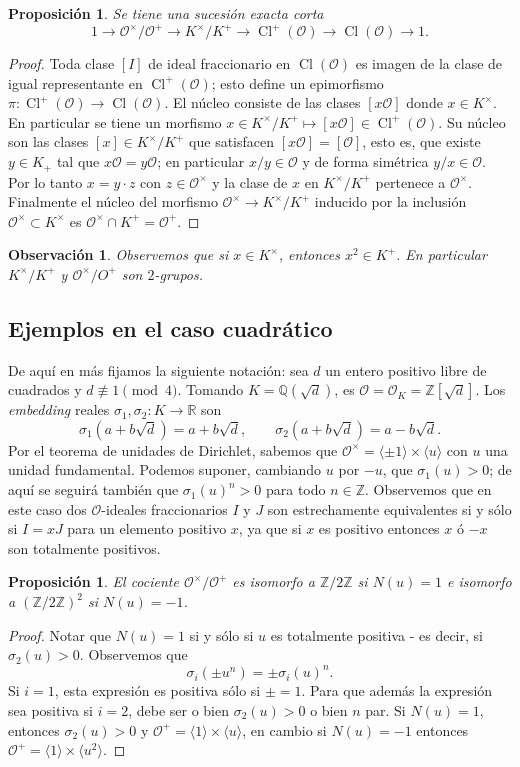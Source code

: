 \documentclass[11pt,a4paper]{amsart}
\newcommand{\R}{\mathbb{R}}
\newcommand{\Q}{\mathbb{Q}}
\newcommand{\Z}{\mathbb{Z}}
\DeclareMathOperator{\CL}{Cl}
\numberwithin{equation}{section}
\theoremstyle{plain}
\newtheorem{prop}[equation]{Proposición}
\newtheorem{obs}[equation]{Observación}
\renewcommand{\O}{\mathcal{O}}
\begin{document}
\begin{prop} Se tiene una sucesión exacta corta
\[
1 \to \O^\times/\O^+ \to K^\times/K^+ \to
\CL^+(\O) \to \CL(\O) \to 1.
\]
\end{prop}
\begin{proof} Toda clase $[I]$ de ideal fraccionario
en $\CL(\O)$ es imagen de la clase de igual representante en $\CL^+(\O)$;
esto define un epimorfismo $\pi \colon \CL^+(\O)\to\CL(\O)$. El núcleo consiste
de las clases $[x \O]$ donde $x \in K^\times$. En particular se tiene
un morfismo $x\in K^\times/K^+ \mapsto [x \O] \in \CL^+(\O)$.
Su núcleo son las clases $[x] \in K^\times/K^+$ que satisfacen
$[x\O] = [\O]$, esto es, que existe $y \in K_+$ tal que $x \O = y \O$;
en particular $x/y \in \O$ y de forma simétrica $y/x \in \O$.
Por lo tanto $x = y \cdot z$ con $z \in \O^\times$
y la clase de $x$ en $K^\times/K^+$ pertenece a $\O^\times$. Finalmente
el núcleo del morfismo $\O^\times \to K^\times/K^+$ inducido por la inclusión
$\O^\times \subset K^\times$ es $\O^\times \cap K^+ = \O^+$.
\end{proof}

\begin{obs} Observemos que si $x \in K^\times$, entonces $x^2 \in K^+$.
En particular $K^\times/K^+$ y $\O^\times/O^+$ son $2$-grupos.
\end{obs}

\subsection{Ejemplos en el caso cuadrático} De aquí en más fijamos
la siguiente notación: sea $d$ un entero positivo
libre de cuadrados y
$d \not \equiv 1 \pmod{4}$. Tomando $K = \Q(\sqrt{d})$, es $\O = \O_K =
\Z[\sqrt{d}]$. Los \textit{embedding} reales $\sigma_1, \sigma_2 \colon K
\to \R$ son
\[
\sigma_1(a+b\sqrt{d}) = a+b\sqrt{d}, \qquad
\sigma_2(a+b\sqrt{d}) = a-b\sqrt{d}.
\]
Por el teorema de unidades de Dirichlet, sabemos que $\mathcal O^\times
= \langle\pm 1\rangle \times \langle u \rangle$ con $u$ una unidad
fundamental. Podemos suponer, cambiando $u$ por $-u$, que $\sigma_1(u) > 0$;
de aquí se seguirá también que $\sigma_1(u)^n > 0$ para todo $n \in \Z$.
Observemos que en este caso
dos $\O$-ideales fraccionarios $I$ y $J$
son estrechamente equivalentes si y sólo
si $I = xJ$ para un elemento positivo $x$, ya que si $x$ es positivo
entonces $x$ ó $-x$ son totalmente positivos.

\begin{prop} El cociente $\O^\times/\O^+$ es isomorfo a $\Z/2\Z$
si $N(u) = 1$ e isomorfo a $(\Z/2\Z)^2$ si $N(u) = -1$.
\end{prop}
\begin{proof}
Notar que $N(u) = 1$ si y sólo si $u$ es totalmente positiva
- es decir, si $\sigma_2(u)>0$. Observemos que
\[
\sigma_i(\pm u^n) = \pm \sigma_i(u)^n.
\]
Si $i = 1$, esta expresión es positiva sólo si $\pm = 1$. Para que además
la expresión sea positiva si $i = 2$, debe ser o bien $\sigma_2(u) > 0$
o bien $n$ par. Si $N(u) = 1$, entonces $\sigma_2(u) > 0$ y $\O^+
= \langle 1 \rangle \times \langle u \rangle$, en cambio si $N(u) = -1$
entonces $\O^+ = \langle 1 \rangle \times \langle u^2 \rangle$.
\end{proof}
\end{document}
